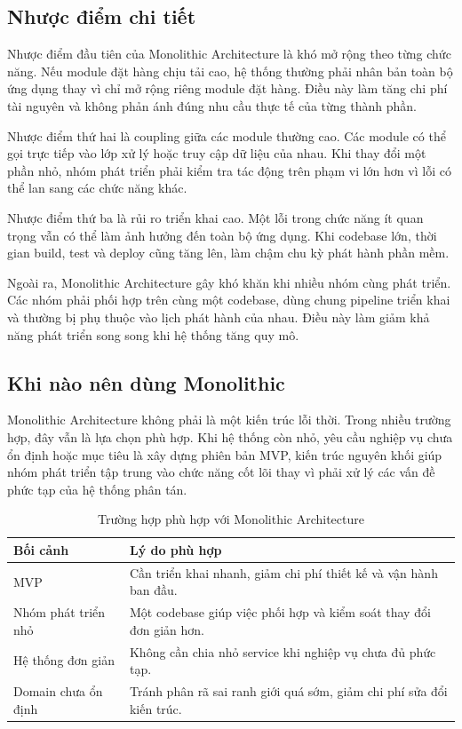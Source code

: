 \documentclass[../main.tex]{subfiles}
\begin{document}
\subsection{Nhược điểm chi tiết}

Nhược điểm đầu tiên của Monolithic Architecture là khó mở rộng theo từng chức năng. Nếu module đặt hàng chịu tải cao, hệ thống thường phải nhân bản toàn bộ ứng dụng thay vì chỉ mở rộng riêng module đặt hàng. Điều này làm tăng chi phí tài nguyên và không phản ánh đúng nhu cầu thực tế của từng thành phần.

Nhược điểm thứ hai là coupling giữa các module thường cao. Các module có thể gọi trực tiếp vào lớp xử lý hoặc truy cập dữ liệu của nhau. Khi thay đổi một phần nhỏ, nhóm phát triển phải kiểm tra tác động trên phạm vi lớn hơn vì lỗi có thể lan sang các chức năng khác.

Nhược điểm thứ ba là rủi ro triển khai cao. Một lỗi trong chức năng ít quan trọng vẫn có thể làm ảnh hưởng đến toàn bộ ứng dụng. Khi codebase lớn, thời gian build, test và deploy cũng tăng lên, làm chậm chu kỳ phát hành phần mềm.

Ngoài ra, Monolithic Architecture gây khó khăn khi nhiều nhóm cùng phát triển. Các nhóm phải phối hợp trên cùng một codebase, dùng chung pipeline triển khai và thường bị phụ thuộc vào lịch phát hành của nhau. Điều này làm giảm khả năng phát triển song song khi hệ thống tăng quy mô.

\subsection{Khi nào nên dùng Monolithic}

Monolithic Architecture không phải là một kiến trúc lỗi thời. Trong nhiều trường hợp, đây vẫn là lựa chọn phù hợp. Khi hệ thống còn nhỏ, yêu cầu nghiệp vụ chưa ổn định hoặc mục tiêu là xây dựng phiên bản MVP, kiến trúc nguyên khối giúp nhóm phát triển tập trung vào chức năng cốt lõi thay vì phải xử lý các vấn đề phức tạp của hệ thống phân tán.

\begin{table}[H]
    \centering
    \caption{Trường hợp phù hợp với Monolithic Architecture}
    \label{tab:chapter1_monolithic_fit}
    \begin{tabular}{|p{}|p{}|}
        \hline
        \rowcolor{primary!35}
        \textbf{Bối cảnh} & \textbf{Lý do phù hợp} \\
        \hline
        MVP & Cần triển khai nhanh, giảm chi phí thiết kế và vận hành ban đầu. \\
        \hline
        Nhóm phát triển nhỏ & Một codebase giúp việc phối hợp và kiểm soát thay đổi đơn giản hơn. \\
        \hline
        Hệ thống đơn giản & Không cần chia nhỏ service khi nghiệp vụ chưa đủ phức tạp. \\
        \hline
        Domain chưa ổn định & Tránh phân rã sai ranh giới quá sớm, giảm chi phí sửa đổi kiến trúc. \\
        \hline
    \end{tabular}
\end{table}
\end{document}
